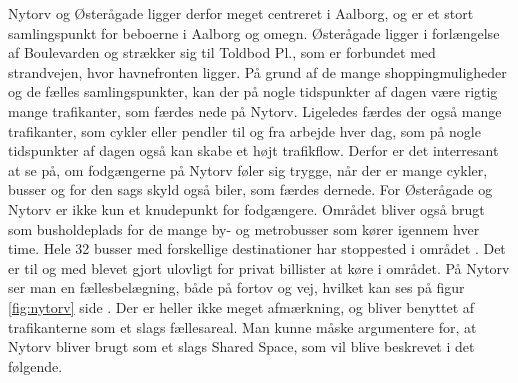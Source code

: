 Nytorv og Østerågade ligger derfor meget centreret i Aalborg, og er et stort samlingspunkt for beboerne i Aalborg og omegn. Østerågade ligger i forlængelse af Boulevarden og strækker sig til Toldbod Pl., som er forbundet med strandvejen, hvor havnefronten ligger. På grund af de mange shoppingmuligheder og de fælles samlingspunkter, kan der på nogle tidspunkter af dagen være rigtig mange trafikanter, som færdes nede på Nytorv. Ligeledes færdes der også mange trafikanter, som cykler eller pendler til og fra arbejde hver dag, som på nogle tidspunkter af dagen også kan skabe et højt trafikflow. Derfor er det interresant at se på, om fodgængerne på Nytorv føler sig trygge, når der er mange cykler, busser og for den sags skyld også biler, som færdes dernede. For Østerågade og Nytorv er ikke kun et knudepunkt for fodgængere. Området bliver også brugt som busholdeplads for de mange by- og metrobusser som kører igennem hver time. Hele 32 busser med forskellige destinationer har stoppested i området \autocite{busser}. Det er til og med blevet gjort ulovligt for privat billister at køre i området.  På Nytorv ser man en fællesbelægning, både på fortov og vej, hvilket kan ses på figur \cref{fig:nytorv} side \pageref{fig:nytorv}. Der er heller ikke meget afmærkning, og bliver benyttet af trafikanterne som et slags fællesareal. Man kunne måske argumentere for, at Nytorv bliver brugt som et slags Shared Space, som vil blive beskrevet i det følgende. 